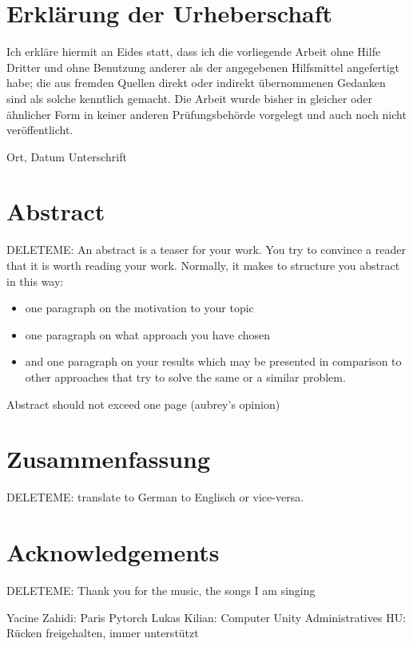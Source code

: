 \chapter*{Erkl{\"a}rung der Urheberschaft}
Ich erkl\"are hiermit an Eides statt, 
dass ich die vorliegende Arbeit ohne Hilfe Dritter 
und ohne Benutzung anderer als der angegebenen Hilfsmittel angefertigt habe; 
die aus fremden Quellen direkt 
oder indirekt \"ubernommenen Gedanken sind als solche kenntlich gemacht. 
Die Arbeit wurde bisher in gleicher oder \"ahnlicher Form 
in keiner anderen Pr\"ufungsbeh\"orde vorgelegt 
und auch noch nicht ver\"offentlicht.


\vspace{4cm}

Ort, Datum \hfill Unterschrift

\newpage
\chapter*{Abstract}
DELETEME: An abstract is a teaser for your work. You try to convince a reader that it is worth reading your work. Normally, it makes to structure you abstract in this way: 
\begin{itemize}
\item one paragraph on the motivation to your topic
\item one paragraph on what approach you have chosen
\item and one paragraph on your results which may be presented in comparison to other approaches that try to solve the same or a similar problem.
\end{itemize}
Abstract should not exceed one page (aubrey's opinion)

\newpage
\chapter*{Zusammenfassung}
DELETEME: translate to German to Englisch or vice-versa.

\newpage
\chapter*{Acknowledgements}
DELETEME: Thank you for the music, the songs I am singing

Yacine Zahidi: Paris Pytorch
Lukas Kilian: Computer Unity Administratives
HU: Rücken freigehalten, immer unterstützt

